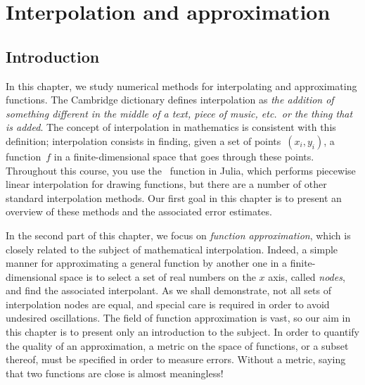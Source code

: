 \chapter{Interpolation and approximation}%
\label{cha:interpolation_and_approximation}

\minitoc

\newpage
\section*{Introduction}
In this chapter,
we study numerical methods for interpolating and approximating functions.
The Cambridge dictionary defines interpolation as \emph{the addition of something different in the middle of a text, piece of music, etc.~or the thing that is added}.
The concept of interpolation in mathematics is consistent with this definition;
interpolation consists in finding, given a set of points~$(x_i, y_i)$,
a function~$f$ in a finite-dimensional space that goes through these points.
Throughout this course, you use the~ function in Julia,
which performs piecewise linear interpolation for drawing functions,
but there are a number of other standard interpolation methods.
Our first goal in this chapter is to present an overview of these methods and the associated error estimates.

In the second part of this chapter,
we focus on \emph{function approximation},
which is closely related to the subject of mathematical interpolation.
Indeed, a simple manner for approximating a general function by another one in a finite-dimensional space is to select a set of real numbers on the $x$ axis,
called \emph{nodes}, and find the associated interpolant.
As we shall demonstrate, not all sets of interpolation nodes are equal,
and special care is required in order to avoid undesired oscillations.
The field of function approximation is vast,
so our aim in this chapter is to present only an introduction to the subject.
In order to quantify the quality of an approximation,
a metric on the space of functions,
or a subset thereof, must be specified in order to measure errors.
Without a metric, saying that two functions are close is almost meaningless!

